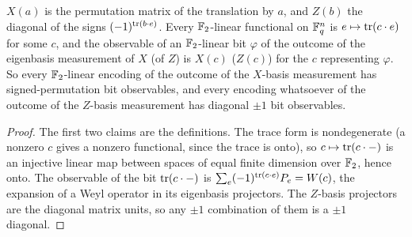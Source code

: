 \begin{lemma}
\label{lem:weyl-signed-perm}
\leanok
$X(a)$ is the permutation matrix of the translation by $a$, and $Z(b)$ the diagonal of the signs
$(-1)^{\operatorname{tr}(b \cdot e)}$. Every $\mathbb{F}_2$-linear functional on $\mathbb{F}_q^n$ is $e \mapsto \operatorname{tr}(c \cdot e)$
for some $c$, and the observable of an $\mathbb{F}_2$-linear bit $\varphi$ of the outcome of the
eigenbasis measurement of $X$ (of $Z$) is $X(c)$ ($Z(c)$) for the $c$ representing $\varphi$. So
every $\mathbb{F}_2$-linear encoding of the outcome of the $X$-basis measurement has signed-permutation
bit observables, and every encoding whatsoever of the outcome of the $Z$-basis measurement has
diagonal $\pm 1$ bit observables.
\end{lemma}

\begin{proof}
\leanok
The first two claims are the definitions. The trace form is nondegenerate (a nonzero $c$ gives a
nonzero functional, since the trace is onto), so $c \mapsto \operatorname{tr}(c \cdot -)$ is an injective
linear map between spaces of equal finite dimension over $\mathbb{F}_2$, hence onto. The observable of
the bit $\operatorname{tr}(c \cdot -)$ is $\sum_e (-1)^{\operatorname{tr}(c \cdot e)} P_e = W(c)$, the expansion of a Weyl
operator in its eigenbasis projectors. The $Z$-basis projectors are the diagonal matrix units,
so any $\pm 1$ combination of them is a $\pm 1$ diagonal.
\end{proof}

